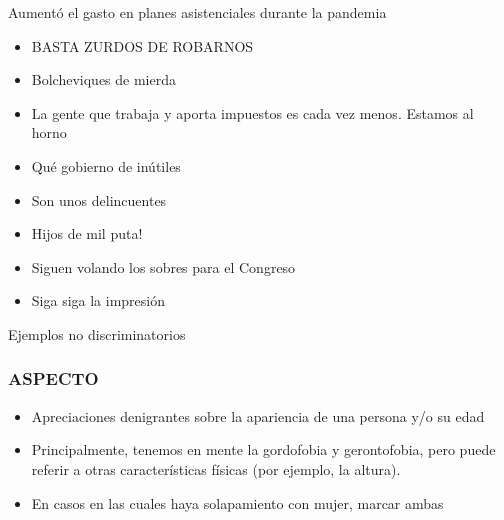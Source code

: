\begin{displayquote}
     Aumentó el gasto en planes asistenciales durante la pandemia

    \begin{itemize}
        \item BASTA ZURDOS DE ROBARNOS
        \item Bolcheviques de mierda
    \end{itemize}


    \begin{itemize}
        \item La gente que trabaja y aporta impuestos es cada vez menos. Estamos al horno
        \item Qué gobierno de inútiles
        \item Son unos delincuentes
        \item Hijos de mil puta!
        \item Siguen volando los sobres para el Congreso
        \item Siga siga la impresión
    \end{itemize}

\end{displayquote}


Ejemplos no discriminatorios




\subsubsection{ASPECTO}

\begin{itemize}
    \item Apreciaciones denigrantes sobre la apariencia de una persona y/o su edad
    \item Principalmente, tenemos en mente la gordofobia y gerontofobia, pero puede referir a otras características físicas (por ejemplo, la altura).
    \item En casos en las cuales haya solapamiento con mujer, marcar ambas
\end{itemize}



